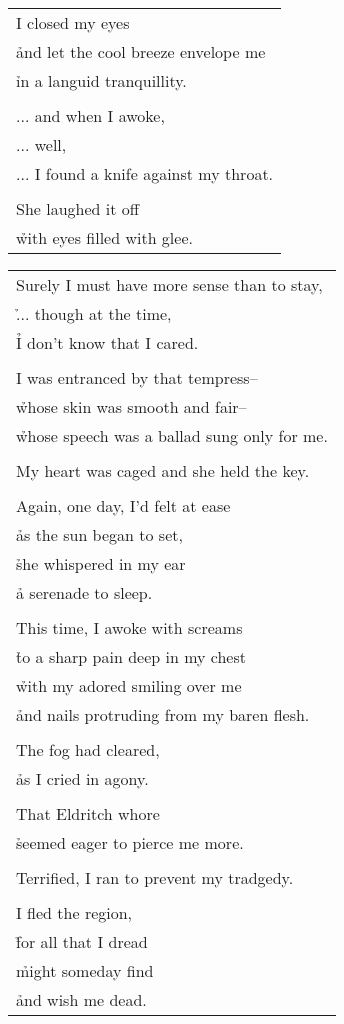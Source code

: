 \documentclass{article}
\begin{document}
\begin{center}
\begin{tabular}{l}
\\
I closed my eyes \\
\h and let the cool breeze envelope me \\
\h in a languid tranquillity. \\
\\
... and when I awoke, \\
... well, \\
... I found a knife against my throat. \\
\\
She laughed it off \\
\h with eyes filled with glee. \\
\end{tabular}
\newpage
\begin{tabular}{l}
Surely I must have more sense than to stay, \\
\h ... though at the time, \\
\h I don't know that I cared. \\
\\
I was entranced by that tempress-- \\
\h whose skin was smooth and fair-- \\
\h whose speech was a ballad sung only for me. \\
\\
My heart was caged and she held the key. \\
\\
Again, one day, I'd felt at ease \\
\h as the sun began to set, \\
\h she whispered in my ear \\
\h a serenade to sleep. \\
\\
This time, I awoke with screams \\
\h to a sharp pain deep in my chest \\
\h with my adored smiling over me \\
\h and nails protruding from my baren flesh. \\
\\
The fog had cleared, \\
\h as I cried in agony. \\
\\
That Eldritch whore \\
\h seemed eager to pierce me more. \\
\\
Terrified, I ran to prevent my tradgedy. \\
\\
I fled the region, \\
\h for all that I dread \\
\h might someday find \\
\h and wish me dead. \\
\end{tabular}
\end{center}
\end{document}
